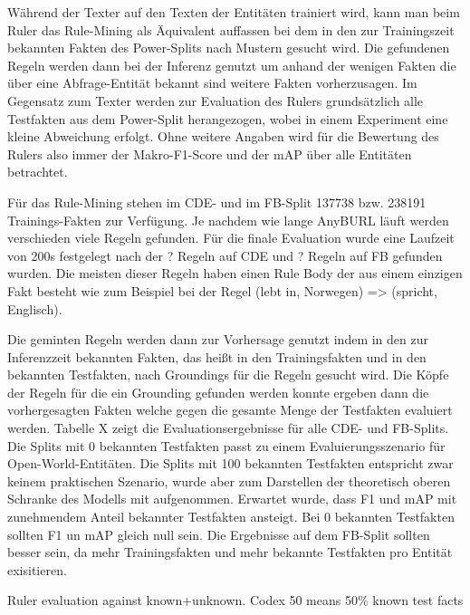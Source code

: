 Während der Texter auf den Texten der Entitäten trainiert wird, kann man beim Ruler das Rule-Mining als Äquivalent auffassen bei dem in den zur Trainingszeit bekannten Fakten des Power-Splits nach Mustern gesucht wird. Die gefundenen Regeln werden dann bei der Inferenz genutzt um anhand der wenigen Fakten die über eine Abfrage-Entität bekannt sind weitere Fakten vorherzusagen. Im Gegensatz zum Texter werden zur Evaluation des Rulers grundsätzlich alle Testfakten aus dem Power-Split herangezogen, wobei in einem Experiment eine kleine Abweichung erfolgt. Ohne weitere Angaben wird für die Bewertung des Rulers also immer der Makro-F1-Score und der mAP über alle Entitäten betrachtet.

Für das Rule-Mining stehen im CDE- und im FB-Split 137738 bzw. 238191 Trainings-Fakten zur Verfügung. Je nachdem wie lange AnyBURL läuft werden verschieden viele Regeln gefunden. Für die finale Evaluation wurde eine Laufzeit von 200s festgelegt nach der ? Regeln auf CDE und ? Regeln auf FB gefunden wurden. Die meisten dieser Regeln haben einen Rule Body der aus einem einzigen Fakt besteht wie zum Beispiel bei der Regel (lebt in, Norwegen) => (spricht, Englisch).

Die geminten Regeln werden dann zur Vorhersage genutzt indem in den zur Inferenzzeit bekannten Fakten, das heißt in den Trainingsfakten und in den bekannten Testfakten, nach Groundings für die Regeln gesucht wird. Die Köpfe der Regeln für die ein Grounding gefunden werden konnte ergeben dann die vorhergesagten Fakten welche gegen die gesamte Menge der Testfakten evaluiert werden. Tabelle X zeigt die Evaluationsergebnisse für alle CDE- und FB-Splits. Die Splits mit 0 bekannten Testfakten passt zu einem Evaluierungsszenario für Open-World-Entitäten. Die Splits mit 100 bekannten Testfakten entspricht zwar keinem praktischen Szenario, wurde aber zum Darstellen der theoretisch oberen Schranke des Modells mit aufgenommen. Erwartet wurde, dass F1 und mAP mit zunehmendem Anteil bekannter Testfakten ansteigt. Bei 0 bekannten Testfakten sollten F1 un mAP gleich null sein. Die Ergebnisse auf dem FB-Split sollten besser sein, da mehr Trainingsfakten und mehr bekannte Testfakten pro Entität exisitieren.


\begin{table}
    \centering
    
    \caption{Ruler evaluation against known+unknown. Codex 50 means 50\% known test facts}
    \label{tab:5_experiments/5_ruler/results}
\end{table}

